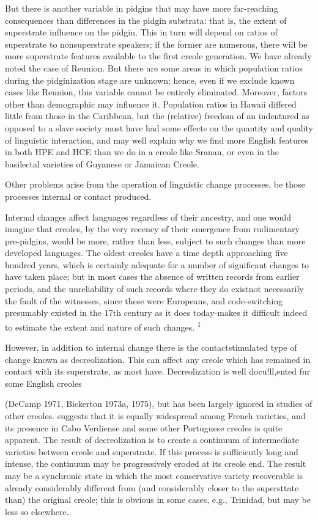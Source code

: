 But there is another variable in pidgins that may have more far-reaching consequences than differences in the pidgin substrata: that is, the extent of superstrate influence on the pidgin. This in turn will depend on ratios of superstrate to nonsuperstrate speakers; if the former are numerous, there will be more superstrate features avail\-able to the first creole generation. We have already noted the case of Reunion. But there are some areas in which population ratios during the pidginization stage are unknown; hence, even if we exclude known cases like Reunion, this variable cannot be entirely eliminated. More\-over, factors other than demographic may influence it. Population ratios in Hawaii differed little from those in the Caribbean, but the (relative) freedom of an indentured as opposed to a slave society must have had some effects on the quantity and quality of linguistic inter\-action, and may well explain why we find more English features in both HPE and HCE than we do in a creole like Sranan, or even in the basilectal varieties of Guyanese or Jamaican Creole.

Other problems arise from the operation of linguistic change processes, be those processes internal or contact produced.

Internal changes affect languages regardless of their ancestry, and one would imagine that creoles, by the very recency of their emergence from rudimentary pre-pidgins, would be more, rather than less, subject to such changes than more developed languages. The oldest creoles have a time depth approaching five hundred years, which is certainly adequate for a number of significant changes to have taken place; but in most cases the absence of written records from earlier periods, and the unreliability of such records where they do exist\-not necessarily the fault of the witnesses, since these were Europeans, and code-switching presumably existed in the 17th century as it does today-makes it difficult indeed to estimate the extent and nature of such changes. \textsuperscript{1}

However, in addition to internal change there is the contact\-stimulated type of change known as decreolization. This can affect any creole which has remained in contact with its superstrate, as most have. Decreolization is well docu!ll,ented fur some English creoles


(DeCamp 1971, Bickerton 1973a, 1975), but has been largely ignored in studies of other creoles. \citet{Valdman1973} suggests that it is equally widespread among French varieties, and its presence in Cabo Verdiense and some other Portuguese creoles is quite apparent. The result of decreolization is to create a continuum of intermediate varieties be\-tween creole and superstrate. If this process is sufficiently long and intense, the continuum may be progressively eroded at its creole end. The result may be a synchronic state in which the most conservative variety recoverable is already considerably different from (and con\-siderably closer to the supersttate than) the original creole; this is obvious in some cases, e.g., Trinidad, but may be less so elsewhere.


